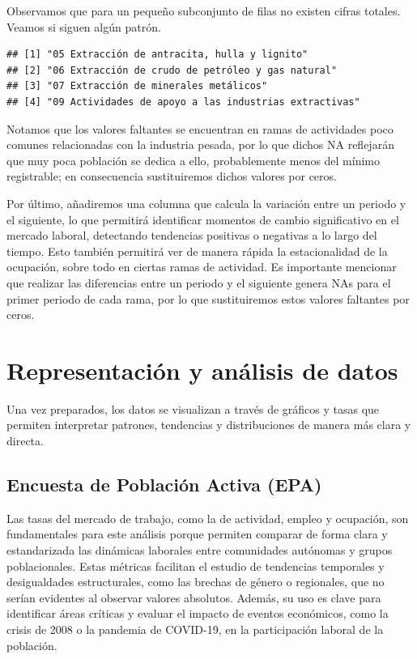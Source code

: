 \documentclass[notspecified,article,submit,moreauthors,pdftex]{Definitions/mdpi}
\begin{document}
Observamos que para un pequeño subconjunto de filas no existen cifras
totales. Veamos si siguen algún patrón.

\begin{verbatim}
## [1] "05 Extracción de antracita, hulla y lignito"         
## [2] "06 Extracción de crudo de petróleo y gas natural"    
## [3] "07 Extracción de minerales metálicos"                
## [4] "09 Actividades de apoyo a las industrias extractivas"
\end{verbatim}

Notamos que los valores faltantes se encuentran en ramas de actividades
poco comunes relacionadas con la industria pesada, por lo que dichos NA
reflejarán que muy poca población se dedica a ello, probablemente menos
del mínimo registrable; en consecuencia sustituiremos dichos valores por
ceros.

Por último, añadiremos una columna que calcula la variación entre un
periodo y el siguiente, lo que permitirá identificar momentos de cambio
significativo en el mercado laboral, detectando tendencias positivas o
negativas a lo largo del tiempo. Esto también permitirá ver de manera
rápida la estacionalidad de la ocupación, sobre todo en ciertas ramas de
actividad. Es importante mencionar que realizar las diferencias entre un
periodo y el siguiente genera NAs para el primer periodo de cada rama,
por lo que sustituiremos estos valores faltantes por ceros.

\section{Representación y análisis de
datos}\label{representaciuxf3n-y-anuxe1lisis-de-datos}

Una vez preparados, los datos se visualizan a través de gráficos y tasas
que permiten interpretar patrones, tendencias y distribuciones de manera
más clara y directa.

\subsection{Encuesta de Población Activa
(EPA)}\label{encuesta-de-poblaciuxf3n-activa-epa-1}

Las tasas del mercado de trabajo, como la de actividad, empleo y
ocupación, son fundamentales para este análisis porque permiten comparar
de forma clara y estandarizada las dinámicas laborales entre comunidades
autónomas y grupos poblacionales. Estas métricas facilitan el estudio de
tendencias temporales y desigualdades estructurales, como las brechas de
género o regionales, que no serían evidentes al observar valores
absolutos. Además, su uso es clave para identificar áreas críticas y
evaluar el impacto de eventos económicos, como la crisis de 2008 o la
pandemia de COVID-19, en la participación laboral de la población.
\end{document}
